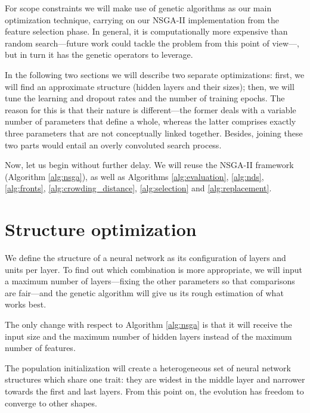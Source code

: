 For scope constraints we will make use of genetic algorithms as our main optimization technique, carrying on our \acs{NSGA-II} implementation from the feature selection phase. In general, it is computationally more expensive than random search---future work could tackle the problem from this point of view---, but in turn it has the genetic operators to leverage.

In the following two sections we will describe two separate optimizations: first, we will find an approximate structure (hidden layers and their sizes); then, we will tune the learning and dropout rates and the number of training epochs. The reason for this is that their nature is different---the former deals with a variable number of parameters that define a whole, whereas the latter comprises exactly three parameters that are not conceptually linked together. Besides, joining these two parts would entail an overly convoluted search process.

Now, let us begin without further delay. We will reuse the \acs{NSGA-II} framework (Algorithm \ref{alg:nsga}), as well as Algorithms \ref{alg:evaluation}, \ref{alg:nds}, \ref{alg:fronts}, \ref{alg:crowding_distance}, \ref{alg:selection} and \ref{alg:replacement}.

\section{Structure optimization}

	We define the structure of a neural network as its configuration of layers and units per layer. To find out which combination is more appropriate, we will input a maximum number of layers---fixing the other parameters so that comparisons are fair---and the genetic algorithm will give us its rough estimation of what works best.

	The only change with respect to Algorithm \ref{alg:nsga} is that it will receive the input size and the maximum number of hidden layers instead of the maximum number of features.

	The population initialization will create a heterogeneous set of neural network structures which share one trait: they are widest in the middle layer and narrower towards the first and last layers. From this point on, the evolution has freedom to converge to other shapes.

	\vspace{0.2cm}

